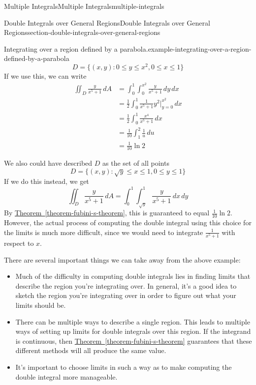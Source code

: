 \documentclass[oneside,10pt,]{book}
\numberwithin{equation}{section}
\begin{document}
\begin{chapterptx}{Multiple Integrals}{}{Multiple Integrals}{}{}{multiple-integrals}
\begin{sectionptx}{Double Integrals over General Regions}{}{Double Integrals over General Regions}{}{}{section-double-integrals-over-general-regions}
\begin{example}{Integrating over a region defined by a parabola.}{example-integrating-over-a-region-defined-by-a-parabola}
\begin{equation*}
D = \{(x,y) : 0\leq y\leq x^{2}, 0\leq x\leq 1\}
\end{equation*}
If we use this, we can write%
\begin{align*}
\iint_{D}\frac{y}{x^{5}+1}\,dA & = \int_{0}^{1}\int_{0}^{x^{2}}\frac{y}{x^{5}+1}\,dy\,dx \\
& = \frac{1}{2}\int_{0}^{1}\frac{1}{x^{5}+1}y^{2}\bigg|_{y=0}^{x^{2}}\,dx \\
& = \frac{1}{2}\int_{0}^{1}\frac{x^{4}}{x^{5}+1}\,dx \\
& = \frac{1}{10}\int_{1}^{2}\frac{1}{u}\,du \\
& =  \frac{1}{10}\ln2
\end{align*}
%
\par
\hypertarget{p-1478}{}%
We also could have described \(D\) as the set of all points%
\begin{equation*}
D = \{(x,y) : \sqrt{y} \leq x\leq 1, 0\leq y\leq 1\}
\end{equation*}
If we do this instead, we get%
\begin{equation*}
\iint_{D}\frac{y}{x^{5}+1}\,dA = \int_{0}^{1}\int_{\sqrt{y}}^{1}\frac{y}{x^{5}+1}\,dx\,dy 
\end{equation*}
By \hyperref[theorem-fubini-s-theorem]{Theorem~\ref{theorem-fubini-s-theorem}}, this is guaranteed to equal \(\frac{1}{10}\ln2\). However, the actual process of computing the double integral using this choice for the limits is much more difficult, since we would need to integrate \(\frac{1}{x^{5}+1}\) with respect to \(x\).%
\end{example}
\hypertarget{p-1479}{}%
There are several important things we can take away from the above example:\leavevmode%
\begin{itemize}[label=\textbullet]
\item{}Much of the difficulty in computing double integrals lies in finding limits that describe the region you're integrating over. In general, it's a good idea to sketch the region you're integrating over in order to figure out what your limits should be.%
\item{}There can be multiple ways to describe a single region. This leads to multiple ways of setting up limits for double integrals over this region. If the integrand is continuous, then \hyperref[theorem-fubini-s-theorem]{Theorem~\ref{theorem-fubini-s-theorem}} guarantees that these different methods will all produce the same value.%
\item{}It's important to choose limits in such a way as to make computing the double integral more manageable.%

\end{itemize}
\end{sectionptx}
\end{chapterptx}
\end{document}
